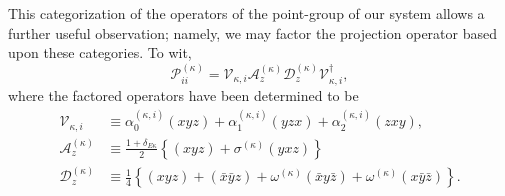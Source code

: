 This categorization of the operators of the point-group of our system allows a further useful observation; namely, we may factor the projection operator based upon these categories. To wit,
\begin{equation}
  \mathcal{P}_{ii}^{\left(\kappa\right)}
  =
  \mathcal{V}_{\kappa,i}
  \mathcal{A}_{z}^{\left(\kappa\right)}
  \mathcal{D}_{z}^{\left(\kappa\right)}
  \mathcal{V}_{\kappa,i}^{\dagger}
  ,
\label{symm-operator}
\end{equation}
where the factored operators have been determined to be
\begin{align}
  \mathcal{V}_{\kappa,i}
  & \equiv
  \alpha_{0}^{\left(\kappa,i\right)}\left(xyz\right)
  + \alpha_{1}^{\left(\kappa,i\right)}\left(yzx\right)
  + \alpha_{2}^{\left(\kappa,i\right)}\left(zxy\right),
  \label{indexing_proj}
  \\
  \mathcal{A}_{z}^{\left(\kappa\right)}
  & \equiv
  \frac{1+\delta_{E\kappa}}{2}
  \left\{
    \left(xyz\right) + \sigma^{\left(\kappa\right)}\left(yxz\right)
  \right\}
  \label{acyclic_proj}
  \\
  \mathcal{D}_{z}^{\left(\kappa\right)}
  & \equiv
  \frac{1}{4}
  \left\{
    \left(xyz\right)
    +
    \left(\bar{x}\bar{y}z\right)
    +
    \omega^{\left(\kappa\right)}
    \left(\bar{x}y\bar{z}\right)
    +
    \omega^{\left(\kappa\right)}
    \left(x\bar{y}\bar{z}\right)
  \right\}
  .
  \label{dblinv_proj}
\end{align}

